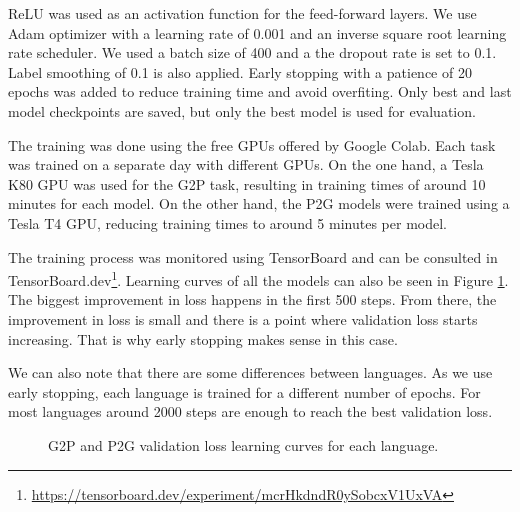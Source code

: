 \documentclass[11pt,a4paper]{article}
\begin{document}
ReLU was used as an activation function for the feed-forward layers. We use Adam optimizer with a learning rate of 0.001 and an inverse square root learning rate scheduler. We used a batch size of 400 and a the dropout rate is set to 0.1. Label smoothing of 0.1 is also applied. Early stopping with a patience of 20 epochs was added to reduce training time and avoid overfiting. Only best and last model checkpoints are saved, but only the best model is used for evaluation.

The training was done using the free GPUs offered by Google Colab. Each task was trained on a separate day with different GPUs. On the one hand, a Tesla K80 GPU was used for the G2P task, resulting in training times of around 10 minutes for each model. On the other hand, the P2G models were trained using a Tesla T4 GPU, reducing training times to around 5 minutes per model. 

The training process was monitored using TensorBoard and can be consulted in TensorBoard.dev\footnote{\url{https://tensorboard.dev/experiment/mcrHkdndR0ySobcxV1UxVA}}. Learning curves of all the models can also be seen in Figure \ref{fig:g2p_p2g_loss}. The biggest improvement in loss happens in the first 500 steps. From there, the improvement in loss is small and there is a point where validation loss starts increasing. That is why early stopping makes sense in this case. 

We can also note that there are some differences between languages. As we use early stopping, each language is trained for a different number of epochs. For most languages around 2000 steps are enough to reach the best validation loss.

\begin{figure}
    \centering
    \caption{G2P and P2G validation loss learning curves for each language.}
    \label{fig:g2p_p2g_loss}
\end{figure}
\end{document}
